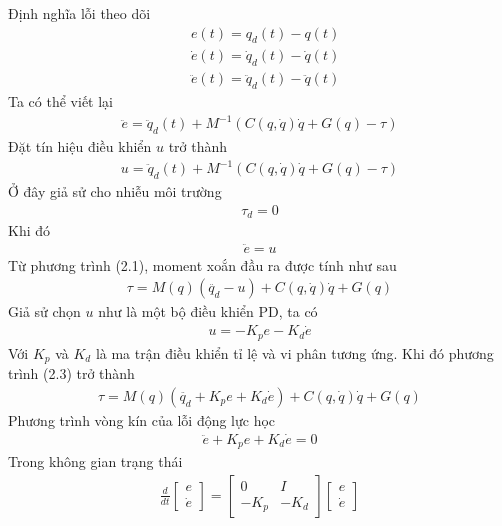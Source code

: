         Định nghĩa lỗi theo dõi
        \begin{align}
            &e(t) = q_d(t) - q(t) \nonumber \\
            &\dot{e}(t) = \dot{q}_d(t) - \dot{q}(t) \nonumber \\
            &\ddot{e}(t) = \ddot{q}_d(t) - \ddot{q}(t) \nonumber
        \end{align}
        Ta có thể viết lại
        \begin{align}
            \ddot{e} = \ddot{q}_d(t) + M^{-1} (C(q, \dot{q})\dot{q} + G(q) - \tau)  \nonumber
        \end{align}
        Đặt tín hiệu điều khiển $u$ trở thành
        \begin{align}
            u = \ddot{q}_d(t) + M^{-1} (C(q, \dot{q})\dot{q} + G(q) - \tau)  
        \end{align}
        Ở đây giả sử cho nhiễu môi trường 
        \begin{align*}
            \tau_d = 0
        \end{align*}
        Khi đó 
        \begin{align*}
            \ddot{e} = u
        \end{align*}
        Từ phương trình (2.1), moment xoắn đầu ra được tính như sau
        \begin{align}
            \tau = M(q)(\ddot{q_d} - u) + C(q, \dot{q})\dot{q} + G(q)
        \end{align}         
        Giả sử chọn $u$ như là một bộ điều khiển PD, ta có
        \begin{align*}
            u = - K_p e - K_d \dot{e}
        \end{align*}
        Với $K_p$ và $K_d$ là ma trận điều khiển tỉ lệ và vi phân tương ứng. Khi đó phương trình (2.3) trở thành
        \begin{align}
            \tau = M(q)(\ddot{q_d} + K_p e + K_d \dot{e}) + C(q, \dot{q})\dot{q} + G(q)
        \end{align} 
        Phương trình vòng kín của lỗi động lực học
        \begin{align}
            \ddot{e} + K_p e + K_d \dot{e} = 0
        \end{align}
        Trong không gian trạng thái
        \begin{align*}
            \frac{d}{dt}
            \begin{bmatrix}
            e \\ \dot{e}
            \end{bmatrix}
            =
            \begin{bmatrix}
            0 & I \\
            -K_p & -K_d
            \end{bmatrix}
            \begin{bmatrix}
            e \\ \dot{e}
            \end{bmatrix}
        \end{align*}
